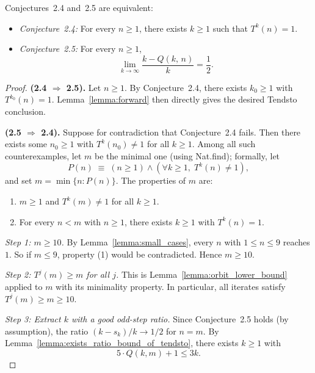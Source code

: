 \begin{lemma}\label{lemma:conjecture_2_4_iff_2_5}\leanok
Conjectures~2.4 and~2.5 are equivalent:
\begin{itemize}
  \item \emph{Conjecture~2.4:} For every $n \ge 1$, there exists $k \ge 1$ such that $T^k(n) = 1$.
  \item \emph{Conjecture~2.5:} For every $n \ge 1$,
    \[
      \lim_{k \to \infty} \frac{k - Q(k,\, n)}{k} = \frac{1}{2}.
    \]
\end{itemize}
\end{lemma}
\begin{proof}\leanok
\textbf{(2.4 $\Rightarrow$ 2.5).}
Let $n \ge 1$. By Conjecture~2.4, there exists $k_0 \ge 1$ with $T^{k_0}(n) = 1$.
Lemma~\ref{lemma:forward} then directly gives the desired Tendsto conclusion.

\textbf{(2.5 $\Rightarrow$ 2.4).}
Suppose for contradiction that Conjecture~2.4 fails.
Then there exists some $n_0 \ge 1$ with $T^k(n_0) \ne 1$ for all $k \ge 1$.
Among all such counterexamples, let $m$ be the minimal one (using Nat.find); formally, let
\[
  P(n) \;\equiv\; (n \ge 1) \land (\forall k \ge 1,\; T^k(n) \ne 1),
\]
and set $m = \min\{n : P(n)\}$. The properties of $m$ are:
\begin{enumerate}
  \item $m \ge 1$ and $T^k(m) \ne 1$ for all $k \ge 1$.
  \item For every $n < m$ with $n \ge 1$, there exists $k \ge 1$ with $T^k(n) = 1$.
\end{enumerate}

\emph{Step 1: $m \ge 10$.}
By Lemma~\ref{lemma:small_cases}, every $n$ with $1 \le n \le 9$ reaches $1$.
So if $m \le 9$, property (1) would be contradicted. Hence $m \ge 10$.

\emph{Step 2: $T^j(m) \ge m$ for all $j$.}
This is Lemma~\ref{lemma:orbit_lower_bound} applied to $m$ with its minimality property.
In particular, all iterates satisfy $T^j(m) \ge m \ge 10$.

\emph{Step 3: Extract $k$ with a good odd-step ratio.}
Since Conjecture~2.5 holds (by assumption), the ratio $(k - s_k)/k \to 1/2$ for $n = m$.
By Lemma~\ref{lemma:exists_ratio_bound_of_tendsto}, there exists $k \ge 1$ with
\[
  5 \cdot Q(k, m) + 1 \le 3k.
\]


\end{proof}
